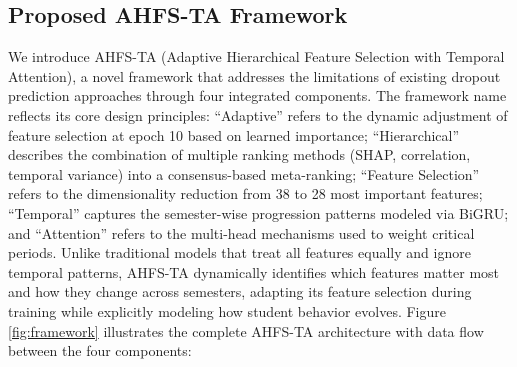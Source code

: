 \documentclass[journal]{IEEEtran}
\begin{document}
\subsection{Proposed AHFS-TA Framework}

We introduce AHFS-TA (Adaptive Hierarchical Feature Selection with Temporal Attention), a novel framework that addresses the limitations of existing dropout prediction approaches through four integrated components. The framework name reflects its core design principles: ``Adaptive'' refers to the dynamic adjustment of feature selection at epoch 10 based on learned importance; ``Hierarchical'' describes the combination of multiple ranking methods (SHAP, correlation, temporal variance) into a consensus-based meta-ranking; ``Feature Selection'' refers to the dimensionality reduction from 38 to 28 most important features; ``Temporal'' captures the semester-wise progression patterns modeled via BiGRU; and ``Attention'' refers to the multi-head mechanisms used to weight critical periods. Unlike traditional models that treat all features equally and ignore temporal patterns, AHFS-TA dynamically identifies which features matter most and how they change across semesters, adapting its feature selection during training while explicitly modeling how student behavior evolves. Figure \ref{fig:framework} illustrates the complete AHFS-TA architecture with data flow between the four components:
\end{document}
